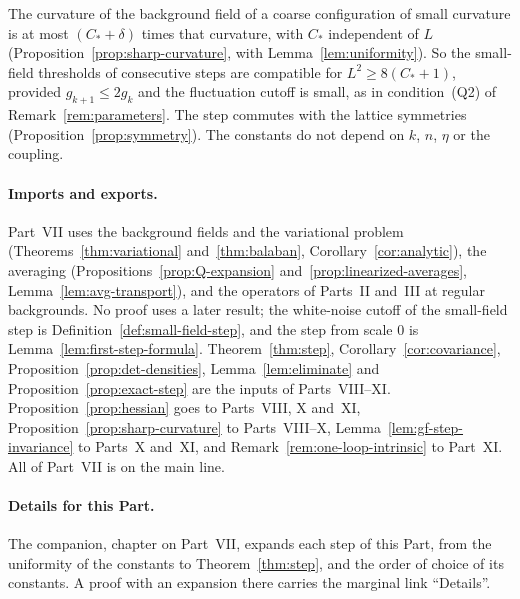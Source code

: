 The curvature of the background field of a coarse configuration of small curvature is at most $(C_*+\delta)$ times that curvature, with $C_*$ independent of $L$ (Proposition~\ref{prop:sharp-curvature}, with Lemma~\ref{lem:uniformity}). So the small-field thresholds of consecutive steps are compatible for $L^2\ge8(C_*+1)$, provided $g_{k+1}\le2g_k$ and the fluctuation cutoff is small, as in condition~(Q2) of Remark~\ref{rem:parameters}. The step commutes with the lattice symmetries (Proposition~\ref{prop:symmetry}). The constants do not depend on $k$, $n$, $\eta$ or the coupling.

\paragraph{Imports and exports.} Part~VII uses the background fields and the variational problem (Theorems~\ref{thm:variational} and~\ref{thm:balaban}, Corollary~\ref{cor:analytic}), the averaging (Propositions~\ref{prop:Q-expansion} and~\ref{prop:linearized-averages}, Lemma~\ref{lem:avg-transport}), and the operators of Parts~II and~III at regular backgrounds. No proof uses a later result; the white-noise cutoff of the small-field step is Definition~\ref{def:small-field-step}, and the step from scale $0$ is Lemma~\ref{lem:first-step-formula}. Theorem~\ref{thm:step}, Corollary~\ref{cor:covariance}, Proposition~\ref{prop:det-densities}, Lemma~\ref{lem:eliminate} and Proposition~\ref{prop:exact-step} are the inputs of Parts~VIII--XI. Proposition~\ref{prop:hessian} goes to Parts~VIII, X and~XI, Proposition~\ref{prop:sharp-curvature} to Parts~VIII--X, Lemma~\ref{lem:gf-step-invariance} to Parts~X and~XI, and Remark~\ref{rem:one-loop-intrinsic} to Part~XI. All of Part~VII is on the main line.

\paragraph{Details for this Part.} The companion, chapter on Part~VII, expands each step of this Part, from the uniformity of the constants to Theorem~\ref{thm:step}, and the order of choice of its constants. A proof with an expansion there carries the marginal link ``Details''.
